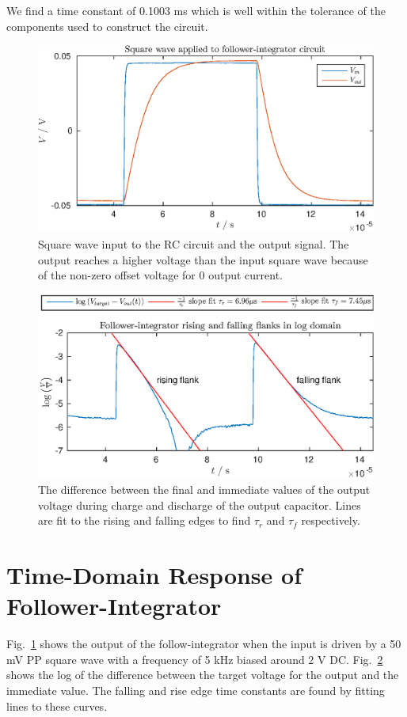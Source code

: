 We find a time constant of 0.1003 ms which is well within the tolerance of the components used to construct the circuit.
\begin{figure}[!htb]
    \center
    \includegraphics{ex2-step.eps}
    \caption{Square wave input to the RC circuit and the output signal. The output reaches a higher voltage than the input square wave
    because of the non-zero offset voltage for 0 output current.}
    \label{fig:ex2-1}
\end{figure}
\begin{figure}[!htb]
    \center
    \includegraphics{ex2-log.eps}
    \caption{The difference between the final and immediate values of the output voltage during charge and discharge of the output capacitor. 
    Lines are fit to the rising and falling edges to find \(\tau_r\) and \(\tau_f\) respectively.}
    \label{fig:ex2-2}
\end{figure}
\section{Time-Domain Response of Follower-Integrator}
Fig.~\ref{fig:ex2-1} shows the output of the follow-integrator when the input is driven by a 50 mV PP square wave with a frequency of 5 kHz biased around
2 V DC. Fig.~\ref{fig:ex2-2} shows the log of the difference between the target voltage for the output and the immediate value.
The falling and rise edge time constants are found by fitting lines to these curves.

